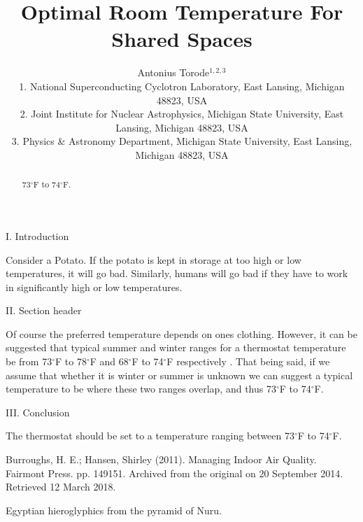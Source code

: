 \documentclass[11pt]{article}
\title{Optimal Room Temperature For Shared Spaces}
\author{Antonius Torode$^{1,2,3}$\\ \scriptsize{1. National Superconducting Cyclotron Laboratory, East Lansing, Michigan 48823, USA} \\ \scriptsize{2. Joint Institute for Nuclear Astrophysics, Michigan State University, East Lansing, Michigan 48823, USA} \\ \scriptsize{3. Physics \& Astronomy Department, Michigan State University, East Lansing, Michigan 48823, USA}}
\date{}
\begin{document}
\maketitle
\thispagestyle{fancy}

\begin{abstract}
	73$^\circ$F to 74$^\circ$F.
\end{abstract}

\begin{multicols}{2}
	
\begin{center}
	I. Introduction
\end{center}

Consider a Potato. If the potato is kept in storage at too high or low temperatures, it will go bad. Similarly, humans will go bad if they have to work in significantly high or low temperatures.

\begin{center}
	II. Section header
\end{center}

Of course the preferred temperature depends on ones clothing. However, it can be suggested that typical summer and winter ranges for a thermostat temperature be from 73$^\circ$F to 78$^\circ$F and 68$^\circ$F to 74$^\circ$F respectively \cite{Burr}. That being said, if we assume that whether it is winter or summer is unknown \cite{glyph} we can suggest a typical temperature to be where these two ranges overlap, and thus 73$^\circ$F to 74$^\circ$F.
\begin{center}
	III. Conclusion
\end{center}

The thermostat should be set to a temperature ranging between 73$^\circ$F to 74$^\circ$F.


\begin{thebibliography}{9}
	{\footnotesize
	 Burroughs, H. E.; Hansen, Shirley (2011). Managing Indoor Air Quality. Fairmont Press. pp. 149151. Archived from the original on 20 September 2014. Retrieved 12 March 2018.
	
	 Egyptian hieroglyphics from the pyramid of Nuru.
	}
\end{thebibliography}
\end{multicols}

\end{document}
